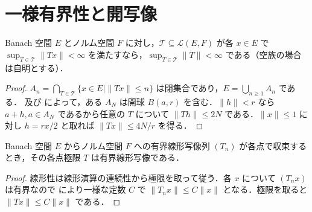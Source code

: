 \section{一様有界性と開写像}
\begin{prop}
Banach 空間 $E$ とノルム空間 $F$ に対し，$\mathcal T\subseteq\mathcal L(E,F)$ が各 $x\in E$ で $\sup_{T\in\mathcal T}\|Tx\|<\infty$ を満たすなら，$\sup_{T\in\mathcal T}\|T\|<\infty$ である（空族の場合は自明とする）．
\end{prop}
\begin{proof}
$A_n=\bigcap_{T\in\mathcal T}\{x\in E\mid\|Tx\|\leq n\}$ は閉集合であり，$E=\bigcup_{n\geq1} A_n$ である． 及び  によって，ある $A_N$ は開球 $B(a,r)$ を含む．$\|h\|<r$ なら $a+h,a\in A_N$ であるから任意の $T$ について $\|Th\|\leq2N$ である．$\|x\|\leq1$ に対し $h=rx/2$ と取れば $\|Tx\|\leq4N/r$ を得る．
\end{proof}
\begin{prop}[有界線形作用素の各点極限]
Banach 空間 $E$ からノルム空間 $F$ への有界線形写像列 $(T_n)$ が各点で収束するとき，その各点極限 $T$ は有界線形写像である．
\end{prop}
\begin{proof}
線形性は線形演算の連続性から極限を取って従う．各 $x$ について $(T_nx)$ は有界なので  により一様な定数 $C$ で $\|T_nx\|\leq C\|x\|$ となる．極限を取ると $\|Tx\|\leq C\|x\|$ である．
\end{proof}

